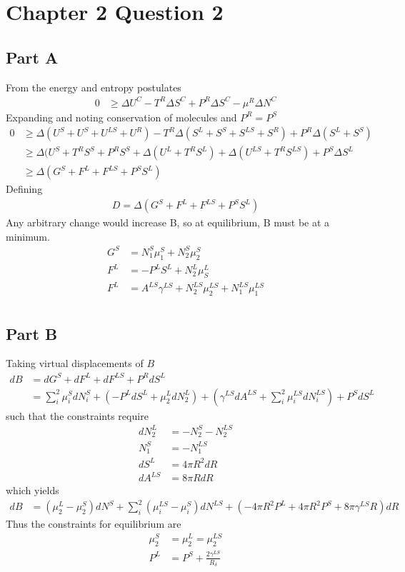 \documentclass{article}
\begin{document}
\section*{Chapter 2 Question 2}

\subsection*{Part A}
From the energy and entropy postulates
\begin{align*}
0&\ge \Delta U^C-T^R\Delta S^C+P^R \Delta S^C-\mu^R \Delta N^C
\end{align*}
Expanding and noting conservation of molecules and $P^R=P^S$
\begin{align*}
0&\ge \Delta (U^S+U^S+U^{LS}+U^R)-T^R\Delta (S^L+S^S+S^{LS}+S^R)+P^R \Delta (S^L+S^S)\\
&\ge \Delta(U^S+T^RS^S+P^RS^S+\Delta(U^L+T^RS^L)+\Delta(U^{LS}+T^RS^{LS}) +P^S \Delta S^L\\
&\ge \Delta(G^S+F^L+F^{LS}+P^S S^L)
\end{align*}
Defining
\begin{align*}
D=\Delta(G^S+F^L+F^{LS}+P^S S^L)
\end{align*}
Any arbitrary change would increase B, so at equilibrium, B must be at a minimum.
\begin{align*}
G^S&=N^S_1\mu^S_1+N^S_2\mu^S_2\\
F^L&=-P^LS^L+N^L_2\mu^L_S\\
F^L&=A^{LS}\gamma^{LS}+N^{LS}_2\mu^{LS}_2+N^{LS}_1\mu^{LS}_1\\
\end{align*}

\subsection*{Part B}
Taking virtual displacements of $B$
\begin{align*}
dB&=dG^S+dF^L+dF^{LS}+P^R dS^L\\
&=\sum_i^2\mu^S_i dN^S_i+(-P^LdS^L +\mu ^L_2 dN^L_2)+(\gamma^{LS}dA^{LS} +\sum_i^2\mu ^{LS}_i dN^{LS}_i)+P^{S}dS^L
\end{align*}
such that the constraints require
\begin{align*}
dN^L_2&=-N^S_2-N^{LS}_2\\
N^S_1&=-N^{LS}_1\\
dS^L&=4 \pi R^2 dR\\
dA^{LS}&= 8 \pi R dR
\end{align*}
which yields
\begin{align*}
dB&=(\mu^L_2-\mu^S_2)dN^S+\sum_i^2(\mu^{LS}_i-\mu^S_i)dN^{LS}+(-4\pi R^2P^L+4\pi R^2P^S+8\pi\gamma^{LS}R)dR
\end{align*}
Thus the constraints for equilibrium are
\begin{align*}
\mu^S_2&=\mu^L_2=\mu^{LS}_2\\
P^L &=P^S +\frac{2\gamma^{LS}}{R_\delta}
\end{align*}
\end{document}
